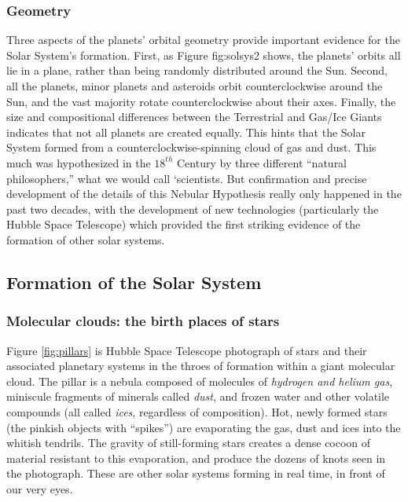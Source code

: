 \documentclass[amstex,12pt]{book}
\begin{document}
\subsubsection{Geometry}
Three aspects of the planets' orbital geometry provide important evidence for the Solar System's formation. First, as Figure {fig:solsys2} shows, the planets' orbits all lie in a plane, rather than being randomly distributed around the Sun. Second, all the planets, minor planets and asteroids orbit counterclockwise around the Sun, and the vast majority rotate counterclockwise about their axes. Finally, the size and compositional differences between the Terrestrial and Gas/Ice Giants indicates that not all planets are created equally. This hints that the Solar System formed from a counterclockwise-spinning cloud of gas and dust. This much was hypothesized in the $18^{th}$ Century by three different ``natural philosophers,'' what we would call `scientists. But confirmation and precise development of the details of this Nebular Hypothesis really only happened in the past two decades, with the development of new technologies (particularly the Hubble Space Telescope) which provided the first striking evidence of the formation of other solar systems.\\

\subsection{Formation of the Solar System}
\subsubsection{Molecular clouds: the birth places of stars}
Figure \ref{fig:pillars} is Hubble Space Telescope photograph of stars and their associated planetary systems in the throes of formation within a giant molecular cloud. The pillar is a nebula composed of molecules of \emph{hydrogen and helium gas}, miniscule fragments of minerals called \emph{dust}, and frozen water and other volatile compounds (all called \emph{ices}, regardless of composition). Hot, newly formed stars (the pinkish objects with ``spikes'') are evaporating the gas, dust and ices into the whitish tendrils. The gravity of still-forming stars creates a dense cocoon of material resistant to this evaporation, and produce the dozens of knots seen in the photograph. These are other solar systems forming in real time, in front of our very eyes.\\
%
\end{document}
